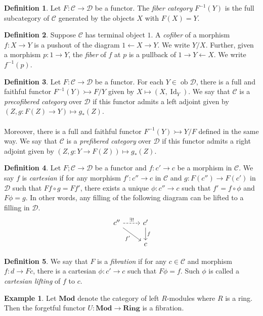 \documentclass[10pt,letterpaper,cm]{nupset}
\theoremstyle{definition}
\newtheorem*{definition}{Definition}
\newtheorem{exmp}{Example}
\newcommand{\1}{\mathbf{1}}
\renewcommand{\c}{\mathscr{C}}
\renewcommand{\d}{\mathscr{D}}
\newcommand{\0}{\vec 0}
\DeclareMathOperator{\id}{Id}
\DeclareMathOperator{\ob}{ob}
\begin{document}
\begin{definition}
Let $F : \c \to \d$ be a functor. The \textit{fiber category} $F^{-1}(Y)$ is the full subcategory of $\c$ generated by the objects $X$ with $F(X) =Y$.
\end{definition}

\begin{definition}
Suppose $\c$ has terminal object $1$. A \textit{cofiber} of a morphism $f: X \to Y$ is a pushout of the diagram $1 \leftarrow X \rightarrow Y$. We write $Y/X$. Further, given a morphism $p: 1 \to Y$, the \textit{fiber} of $f$ at $p$ is a pullback of $1 \rightarrow Y \leftarrow X$. We write $f^{-1}(p)$.
\end{definition}

\begin{definition}
Let $F : \c \to \d$ be a functor. For each $Y \in \ob \d$, there is a full and faithful functor $F^{-1}(Y)  \rightarrowtail F/Y$ given by $X \mapsto (X, \id_Y)$. We say that $\c$ is a \textit{precofibered category} over $\d$ if this functor admits a left adjoint given by $(Z, g: F(Z) \to Y) \mapsto g_{\ast}(Z)$.
\\ \\
Moreover, there is a full and faithful functor $F^{-1}(Y) \rightarrowtail Y/F$ defined in the same way. We say that $\c$ is a \textit{prefibered category} over $\d$ if this functor admits a right adjoint given by $(Z, g: Y \to F(Z)) \mapsto g_{\ast}(Z)$.
\end{definition}

\begin{definition}
Let $F ; \c \to \d$ be a functor and $f: c' \to c$ be a morphism in $\c$. We say $f$ is \textit{cartesian} if for any morphism $f' : c'' \to c$ in $\c$ and $g : F(c'') \to F(c')$ in $\d$ such that $Ff \circ g = Ff'$, there exists a unique $\phi : c'' \to c$ such that $f' = f \circ \phi$ and $F\phi = g$. In other words, any filling of the following diagram can be lifted to a filling in $\d$.
\[ \begin{tikzcd}
c'' \arrow[r, dashed, "\exists!"] \arrow[swap, dr,  " f' "] & c' \arrow[d, "f"] \\%
 & c
\end{tikzcd}
\]
\end{definition}

\begin{definition}
We say that $F$ is a \textit{fibration} if for any $c \in \c$ and morphism $f: d \to Fc$, there is a cartesian $\phi : c' \to c$ such that $F\phi =f$. Such $\phi$ is called a \textit{cartesian lifting} of $f$ to $c$.
\end{definition}

\begin{exmp}
Let $\mathbf{Mod}$ denote the category of left $R$-modules where $R$ is a ring. Then the forgetful functor $U: \mathbf{Mod} \to \mathbf{Ring}$ is a fibration.
\end{exmp}
\end{document}
